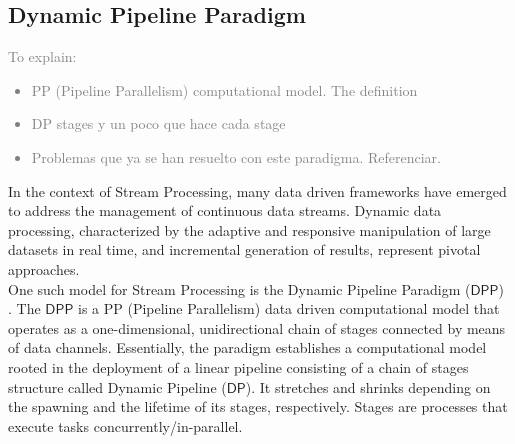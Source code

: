 \newpage

\subsection{Dynamic Pipeline Paradigm}\label{DPP}

\textcolor{gray}{To explain:
\begin{itemize}
    \item PP (Pipeline Parallelism) computational model. The definition
    \item DP stages y un poco que hace cada stage
    \item Problemas que ya se han resuelto con este paradigma. Referenciar.
\end{itemize}
}


In the context of Stream Processing, many data driven frameworks have emerged to address the management of continuous data streams. Dynamic data processing, characterized by the adaptive and responsive manipulation of large datasets in real time, and incremental generation of results, represent pivotal approaches.\\

One such model for Stream Processing is the Dynamic Pipeline Paradigm ($\mathsf{DPP}$) \cite{DP-pasarella2024computational}. The $\mathsf{DPP}$ is a PP (Pipeline Parallelism) data driven computational model that operates as a one-dimensional, unidirectional chain of stages connected by means of data channels. Essentially, the paradigm establishes a computational model rooted in the deployment of a linear pipeline consisting of a chain of stages structure called Dynamic Pipeline ($\mathsf{DP}$). It stretches and
shrinks depending on the spawning and the lifetime of its stages, respectively. Stages are processes that execute tasks concurrently/in-parallel.\\


